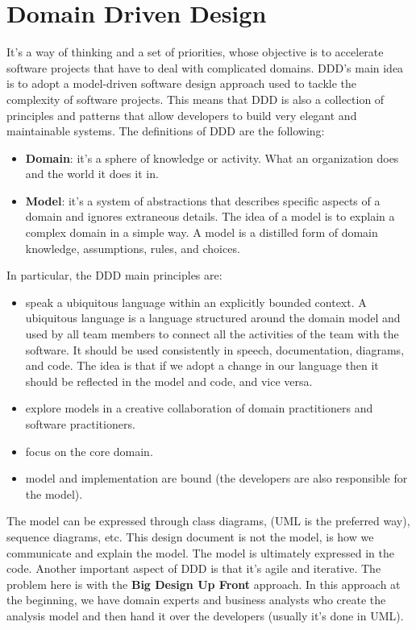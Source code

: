 \section{Domain Driven Design}
It's a way of thinking and a set of priorities, whose objective is to accelerate software projects that have to deal with complicated domains.
DDD's main idea is to adopt a model-driven software design approach used to tackle the complexity of software projects.
This means that DDD is also a collection of principles and patterns that allow developers to build very elegant and maintainable systems.
The definitions of DDD are the following:
\begin{itemize}
    \item \textbf{Domain}: it's a sphere of knowledge or activity. What an organization does and the world it does it in.
    \item \textbf{Model}: it's a system of abstractions that describes specific aspects of a domain and ignores extraneous details. The idea of a model is to explain a complex domain in a simple way. A model is a distilled form of domain knowledge, assumptions, rules, and choices.
\end{itemize}
In particular, the DDD main principles are:
\begin{itemize}
    \item speak a ubiquitous language within an explicitly bounded context. A ubiquitous language is a language structured around the domain model and used by all team members to connect all the activities of the team with the software. It should be used consistently in speech, documentation, diagrams, and code. The idea is that if we adopt a change in our language then it should be reflected in the model and code, and vice versa.
    \item explore models in a creative collaboration of domain practitioners and software practitioners.
    \item focus on the core domain.
    \item model and implementation are bound (the developers are also responsible for the model).
\end{itemize}
The model can be expressed through class diagrams, (UML is the preferred way), sequence diagrams, etc.
This design document is not the model, is how we communicate and explain the model.
The model is ultimately expressed in the code.
Another important aspect of DDD is that it's agile and iterative.
The problem here is with the \textbf{Big Design Up Front} approach.
In this approach at the beginning, we have domain experts and business analysts who create the analysis model and then hand it over the developers (usually it's done in UML).
